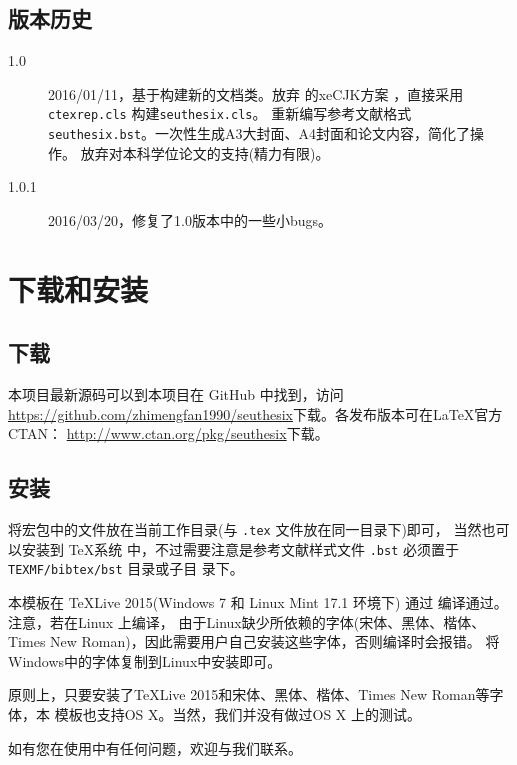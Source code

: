 \documentclass[figurelist,tablelist,algorithmlist,nomlist,masters]{seuthesix}
\begin{document}
\section{版本历史}
\begin{description}
\item[1.0] 2016/01/11，基于\seuthesis 构建新的\seuthesix 文档类。放弃\seuthesis 
的xeCJK方案 ，直接采用\verb+ctexrep.cls+ 构建\verb+seuthesix.cls+。
重新编写参考文献格式\verb+seuthesix.bst+。一次性生成A3大封面、A4封面和论文内容，简化了操作。
放弃对本科学位论文的支持(精力有限)。
\item[1.0.1] 2016/03/20，修复了1.0版本中的一些小bugs。
\end{description}
                   
\chapter{下载和安装}  
\section{下载}     
本项目最新源码可以到本项目在 GitHub 中找到，访问
\url{https://github.com/zhimengfan1990/seuthesix}下载。各发布版本可在\LaTeX 官方 CTAN： 
\url{http://www.ctan.org/pkg/seuthesix}下载。
\section{安装}
将宏包中的文件放在当前工作目录(与 \verb+.tex+ 文件放在同一目录下)即可，
当然也可以安装到 \TeX 系统
中，不过需要注意是参考文献样式文件 \verb+.bst+ 必须置于 \verb+TEXMF/bibtex/bst+ 目录或子目
录下。

本模板在 \TeX{Live} 2015(Windows 7 和 Linux Mint 17.1 环境下) 通过 编译通过。注意，若在Linux 上编译，
由于Linux缺少所依赖的字体(宋体、黑体、楷体、Times New Roman)，因此需要用户自己安装这些字体，否则编译时会报错。
将Windows中的字体复制到Linux中安装即可。

原则上，只要安装了\TeX{Live} 2015和宋体、黑体、楷体、Times New Roman等字体，本
模板也支持OS X。当然，我们并没有做过OS X 上的测试。

如有您在使用中有任何问题，欢迎与我们联系。
\end{document}
